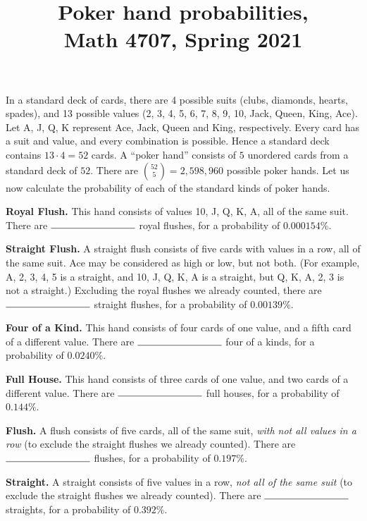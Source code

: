 \documentclass[11pt]{article}
\title{Poker hand probabilities, \\ Math 4707, Spring 2021}
\date{}
\begin{document}
\maketitle

\thispagestyle{empty}

\vspace{-1cm}

In a standard deck of cards, there are 4 possible suits (clubs, diamonds, hearts, spades), and 13 possible values (2, 3, 4, 5, 6, 7, 8, 9, 10, Jack, Queen, King, Ace). Let A, J, Q, K represent Ace, Jack, Queen and King, respectively. Every card has a suit and value, and every combination is possible. Hence a standard deck contains $13 \cdot 4 = 52$ cards. A ``poker hand'' consists of $5$ unordered cards from a standard deck of $52$. There are $\binom{52}{5} = 2, 598, 960$ possible poker hands. Let us now calculate the probability of each of the standard kinds of poker hands.

{\bf Royal Flush.} This hand consists of values 10, J, Q, K, A, all of the same suit. There are $\rule{3cm}{0.15mm}$ royal flushes, for a probability of $0.000154\%$.

{\bf Straight Flush.} A straight flush consists of five cards with values in a row, all of the same suit. Ace may be considered as high or low, but not both. (For example, A, 2, 3, 4, 5 is a straight, and 10, J, Q, K, A is a straight, but Q, K, A, 2, 3 is not a straight.) Excluding the royal flushes we already counted, there are $\rule{3cm}{0.15mm}$ straight flushes, for a probability of $0.00139\%$.

{\bf Four of a Kind.} This hand consists of four cards of one value, and a fifth card of a different value. There are $\rule{3cm}{0.15mm}$ four of a kinds, for a probability of  $0.0240\%$.

{\bf Full House.} This hand consists of three cards of one value, and two cards of a different value. There are $\rule{3cm}{0.15mm}$ full houses, for a probability of $0.144\%$.

{\bf Flush.} A flush consists of five cards, all of the same suit, \emph{with not all values in a row} (to exclude the straight flushes we already counted). There are $\rule{3cm}{0.15mm}$ flushes, for a probability of $0.197\%$.

{\bf Straight.} A straight consists of five values in a row, \emph{not all of the same suit} (to exclude the straight flushes we already counted). There are $\rule{3cm}{0.15mm}$ straights, for a probability of $0.392\%$.
\end{document}
